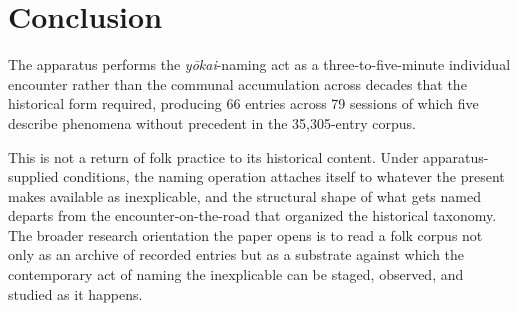 \documentclass[manuscript,review,anonymous,nonacm]{acmart}
\begin{document}
\section{Conclusion}

The apparatus performs the \textit{y\=okai}-naming act as a three-to-five-minute individual encounter rather than the communal accumulation across decades that the historical form required, producing 66 entries across 79 sessions of which five describe phenomena without precedent in the 35{,}305-entry corpus.

This is not a return of folk practice to its historical content. Under apparatus-supplied conditions, the naming operation attaches itself to whatever the present makes available as inexplicable, and the structural shape of what gets named departs from the encounter-on-the-road that organized the historical taxonomy. The broader research orientation the paper opens is to read a folk corpus not only as an archive of recorded entries but as a substrate against which the contemporary act of naming the inexplicable can be staged, observed, and studied as it happens.
\end{document}
